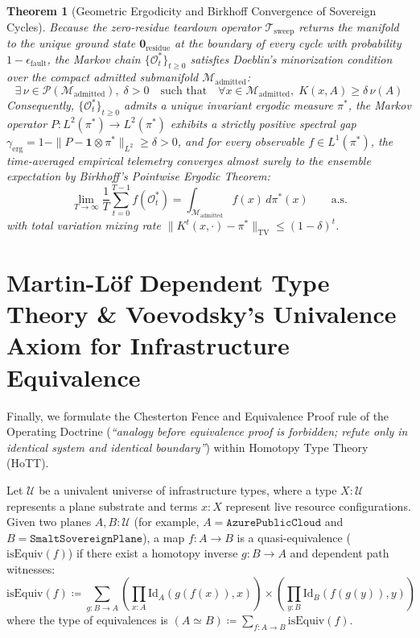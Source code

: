 \documentclass[10pt,twoside,openany]{book}
\theoremstyle{plain}
\newtheorem{theorem}{Theorem}[chapter]
\theoremstyle{definition}
\theoremstyle{remark}
\newcommand{\Oadm}{\mathcal{O}^*}
\begin{document}
\begin{theorem}[Geometric Ergodicity and Birkhoff Convergence of Sovereign Cycles]
Because the zero-residue teardown operator $\mathcal{T}_{\mathrm{sweep}}$ returns the manifold to the unique ground state $\mathbf{0}_{\mathrm{residue}}$ at the boundary of every cycle with probability $1 - \epsilon_{\mathrm{fault}}$, the Markov chain $\{\Oadm_t\}_{t \ge 0}$ satisfies Doeblin's minorization condition over the compact admitted submanifold $\mathcal{M}_{\mathrm{admitted}}$:
\begin{equation}
\exists\, \nu \in \mathcal{P}(\mathcal{M}_{\mathrm{admitted}}),\; \delta > 0 \quad \text{such that} \quad \forall x \in \mathcal{M}_{\mathrm{admitted}},\; K(x, A) \ge \delta\,\nu(A)
\end{equation}
Consequently, $\{\Oadm_t\}_{t \ge 0}$ admits a unique invariant ergodic measure $\pi^*$, the Markov operator $P: L^2(\pi^*) \to L^2(\pi^*)$ exhibits a strictly positive spectral gap $\gamma_{\mathrm{erg}} = 1 - \|P - \mathbf{1}\otimes \pi^*\|_{L^2} \ge \delta > 0$, and for every observable $f \in L^1(\pi^*)$, the time-averaged empirical telemetry converges almost surely to the ensemble expectation by Birkhoff's Pointwise Ergodic Theorem:
\begin{equation}
\lim_{T \to \infty} \frac{1}{T} \sum_{t=0}^{T-1} f(\Oadm_t) = \int_{\mathcal{M}_{\mathrm{admitted}}} f(x)\,d\pi^*(x) \qquad \text{a.s.}
\end{equation}
with total variation mixing rate $\|K^t(x, \cdot) - \pi^*\|_{\mathrm{TV}} \le (1 - \delta)^t$.
\end{theorem}

\section{Martin-Löf Dependent Type Theory \& Voevodsky's Univalence Axiom for Infrastructure Equivalence}
Finally, we formulate the Chesterton Fence and Equivalence Proof rule of the Operating Doctrine (\emph{``analogy before equivalence proof is forbidden; refute only in identical system and identical boundary''}) within Homotopy Type Theory (HoTT).

Let $\mathcal{U}$ be a univalent universe of infrastructure types, where a type $X : \mathcal{U}$ represents a plane substrate and terms $x : X$ represent live resource configurations. Given two planes $A, B : \mathcal{U}$ (for example, $A = \mathtt{AzurePublicCloud}$ and $B = \mathtt{SmaltSovereignPlane}$), a map $f : A \to B$ is a quasi-equivalence ($\mathrm{isEquiv}(f)$) if there exist a homotopy inverse $g : B \to A$ and dependent path witnesses:
\begin{equation}
\mathrm{isEquiv}(f) \coloneqq \sum_{g : B \to A} \left(\prod_{x : A} \mathrm{Id}_A(g(f(x)), x)\right) \times \left(\prod_{y : B} \mathrm{Id}_B(f(g(y)), y)\right)
\end{equation}
where the type of equivalences is $(A \simeq B) \coloneqq \sum_{f : A \to B} \mathrm{isEquiv}(f)$.
\end{document}
